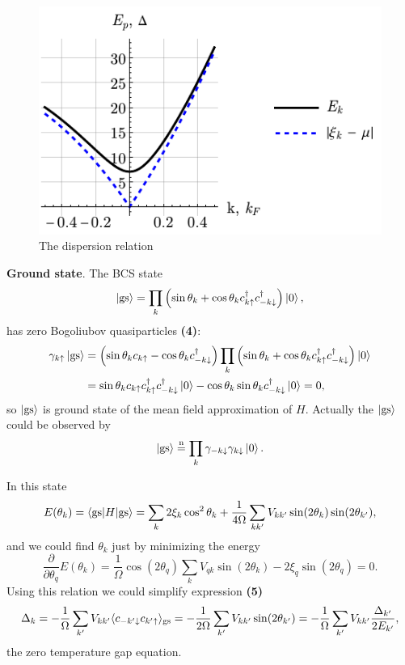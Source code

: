 \begin{figure}[t]
    \centering
    \includegraphics{imgs/MB132.pdf}
    \caption{The dispersion relation}
    \label{fig:131}
\end{figure}


\textbf{Ground state}. The BCS state
\begin{equation*}
	\left| \textnormal{gs} \right\rangle = \prod_k \left(
		\sin \theta_k + \cos \theta_k c_{k \uparrow}^{\dag} c_{-k \downarrow}^{\dag}
	\right) \left| 0 \right\rangle,
\end{equation*}
has zero Bogoliubov quasiparticles \textbf{(4)}:
\begin{align*}
	\gamma_{k \uparrow} \left| \textnormal{gs} \right\rangle &= \left(\sin \theta_k c_{k \uparrow} - \cos \theta_k c_{-k \downarrow}^{\dag}\right) \prod_k \left(
		\sin \theta_k + \cos \theta_k c_{k \uparrow}^{\dag} c_{-k \downarrow}^{\dag}
	\right) \left| 0 \right\rangle 
	\\&= \sin \theta_k c_{k \uparrow} c_{k\uparrow}^{\dag} c_{-k\downarrow}^{\dag} \left| 0 \right\rangle - \cos \theta_k \sin \theta_k c_{-k\downarrow}^{\dag} \left| 0 \right\rangle = 0,
\end{align*}
so $\left| \textnormal{gs} \right\rangle$ is ground state of the mean field approximation of $H$. Actually the $\left| \textnormal{gs} \right\rangle$ could be observed by
\begin{equation*}
	\left| \textnormal{gs} \right\rangle \overset{\mathrm{n}}{=} \prod_{k} \gamma_{-k \downarrow} \gamma_{k \downarrow} \left| 0 \right\rangle.
\end{equation*}

In this state
\begin{equation*}
	E(\theta_k) = \bk{\text{gs}}[H]{\text{gs}} = \sum_k 2 \xi_k \cos^2 \theta_k + \frac{1}{4\Omega} \sum_{k k'} V_{kk'} \sin(2 \theta_k) \sin(2 \theta_{k'}),
\end{equation*}
and we could find $\theta_k$ just by minimizing the energy
\begin{equation*}
	\frac{\partial }{\partial \theta_q} E(\theta_k) = \frac{1}{\Omega}\cos(2 \theta_q) \sum_k V_{qk} \sin(2 \theta_k) - 2 \xi_q \sin(2 \theta_q) = 0.
\end{equation*}
Using this relation we could simplify expression \textbf{(5)}
\begin{equation*}
	\Delta_k = - \frac{1}{\Omega} \sum_{k'} V_{k k'} \langle c_{-k' \downarrow} c_{k' \uparrow} \rangle_{\text{gs}} = - \frac{1}{2\Omega}\sum_{k'}  V_{kk'} \sin(2 \theta_{k'}) = 
	- \frac{1}{\Omega} \sum_{k'} V_{k k'} \frac{\Delta_{k'}}{2 E_{k'}},
\end{equation*}
the zero temperature gap equation.








